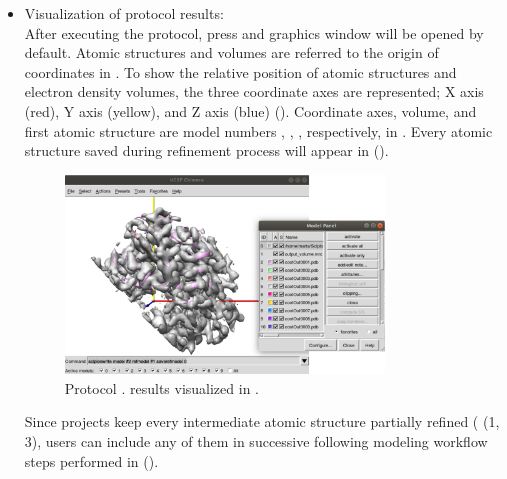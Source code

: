 \begin{itemize}
  
  \item Visualization of protocol results:\\
  
  After executing the protocol, press  and \chimera graphics window will be opened by default. Atomic structures and volumes are referred to the origin of coordinates in \chimera. To show the relative position of atomic structures and electron density volumes, the three coordinate axes are represented; X axis (red), Y axis (yellow), and Z axis (blue) (). Coordinate axes, volume, and first atomic structure are model numbers , , , respectively, in \chimera {}. Every atomic structure saved during \coot refinement process will appear in  ().\\
  
  \begin{figure}[H]
    \centering 
    \captionsetup{width=.7\linewidth} 
    \includegraphics[width=0.80\textwidth]{Images_appendix/Fig123.pdf}
    \caption{Protocol . \coot results visualized in \chimera.}
    \label{fig:app_protocol_coot_5}
   \end{figure}
   
  Since \scipion projects keep every intermediate atomic structure partially refined ( (1, 3), users can include any of them in successive following modeling workflow steps performed in \scipion ().\\
  

\end{itemize}
